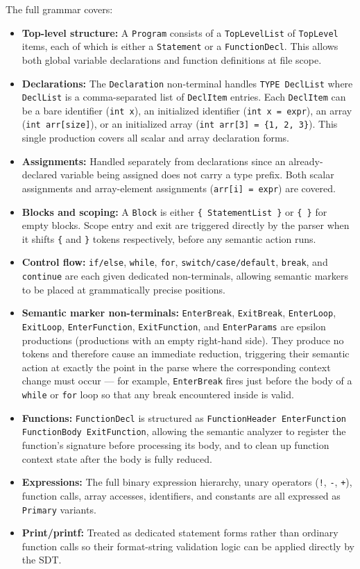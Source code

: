 \documentclass[letterpaper,12pt,oneside]{article}
\begin{document}
The full grammar covers:
\begin{itemize}
    \item \textbf{Top-level structure:} A \texttt{Program}
    consists of a \texttt{TopLevelList} of \texttt{TopLevel} items, each of which is either a \texttt{Statement} or a \texttt{FunctionDecl}. This allows both global variable declarations and function definitions at file scope.
    \item \textbf{Declarations:} The \texttt{Declaration} non-terminal handles \texttt{TYPE DeclList} where \texttt{DeclList} is a comma-separated list of \texttt{DeclItem} entries. Each \texttt{DeclItem} can be a bare identifier (\texttt{int x}), an initialized identifier (\texttt{int x = expr}), an array (\texttt{int arr[size]}), or an initialized array (\texttt{int arr[3] = \{1, 2, 3\}}). This single production covers all scalar and array declaration forms.
    \item \textbf{Assignments:} Handled separately from declarations since an already-declared variable being assigned does not carry a type prefix. Both scalar assignments and array-element assignments (\texttt{arr[i] = expr}) are covered.
    \item \textbf{Blocks and scoping:} A \texttt{Block} is either \texttt{\{ StatementList \}} or \texttt{\{ \}} for empty blocks. Scope entry and exit are triggered directly by the parser when it shifts \texttt{\{} and \texttt{\}} tokens respectively, before any semantic action runs.
    \item \textbf{Control flow:} \texttt{if/else}, \texttt{while}, \texttt{for}, \texttt{switch/case/default}, \texttt{break}, and \texttt{continue} are each given dedicated non-terminals, allowing semantic markers to be placed at grammatically precise positions.
    \item \textbf{Semantic marker non-terminals:} \texttt{EnterBreak}, \texttt{ExitBreak}, \texttt{EnterLoop}, \texttt{ExitLoop}, \texttt{EnterFunction}, \texttt{ExitFunction}, and \texttt{EnterParams} are epsilon productions (productions with an empty right-hand side). They produce no tokens and therefore cause an immediate reduction, triggering their semantic action at exactly the point in the parse where the corresponding context change must occur --- for example, \texttt{EnterBreak} fires just before the body of a \texttt{while} or \texttt{for} loop so that any break encountered inside is valid.
    \item \textbf{Functions:} \texttt{FunctionDecl} is structured as \texttt{FunctionHeader EnterFunction FunctionBody ExitFunction}, allowing the semantic analyzer to register the function's signature before processing its body, and to clean up function context state after the body is fully reduced.
    \item \textbf{Expressions:} The full binary expression hierarchy, unary operators (\texttt{!}, \texttt{-}, \texttt{+}), function calls, array accesses, identifiers, and constants are all expressed as \texttt{Primary} variants.
    \item \textbf{Print/printf:} Treated as dedicated statement forms rather than ordinary function calls so their format-string validation logic can be applied directly by the SDT.
\end{itemize}
\end{document}

